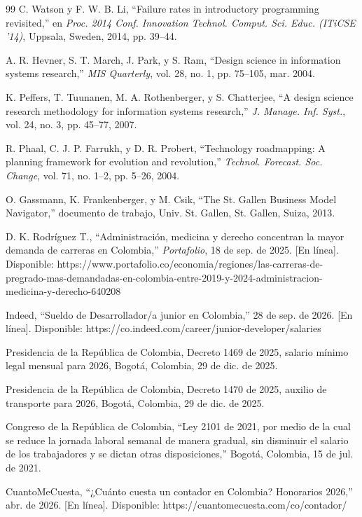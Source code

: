 \documentclass[letterpaper, 10 pt, conference]{ieeeconf}
\begin{document}
\begin{thebibliography}{99}
 C. Watson y F. W. B. Li, “Failure rates in introductory programming revisited,” en \textit{Proc. 2014 Conf. Innovation Technol. Comput. Sci. Educ. (ITiCSE '14)}, Uppsala, Sweden, 2014, pp. 39–44.

 A. R. Hevner, S. T. March, J. Park, y S. Ram, “Design science in information systems research,” \textit{MIS Quarterly}, vol. 28, no. 1, pp. 75–105, mar. 2004.

 K. Peffers, T. Tuunanen, M. A. Rothenberger, y S. Chatterjee, “A design science research methodology for information systems research,” \textit{J. Manage. Inf. Syst.}, vol. 24, no. 3, pp. 45–77, 2007.

 R. Phaal, C. J. P. Farrukh, y D. R. Probert, “Technology roadmapping: A planning framework for evolution and revolution,” \textit{Technol. Forecast. Soc. Change}, vol. 71, no. 1–2, pp. 5–26, 2004.

 O. Gassmann, K. Frankenberger, y M. Csik, “The St. Gallen Business Model Navigator,” documento de trabajo, Univ. St. Gallen, St. Gallen, Suiza, 2013.

 D. K. Rodríguez T., “Administración, medicina y derecho concentran la mayor demanda de carreras en Colombia,” \textit{Portafolio}, 18 de sep. de 2025. [En línea]. Disponible: https://www.portafolio.co/economia/regiones/las-carreras-de-pregrado-mas-demandadas-en-colombia-entre-2019-y-2024-administracion-medicina-y-derecho-640208

 Indeed, “Sueldo de Desarrollador/a junior en Colombia,” 28 de sep. de 2026. [En línea]. Disponible: https://co.indeed.com/career/junior-developer/salaries

 Presidencia de la República de Colombia, Decreto 1469 de 2025, salario mínimo legal mensual para 2026, Bogotá, Colombia, 29 de dic. de 2025.

 Presidencia de la República de Colombia, Decreto 1470 de 2025, auxilio de transporte para 2026, Bogotá, Colombia, 29 de dic. de 2025.

 Congreso de la República de Colombia, “Ley 2101 de 2021, por medio de la cual se reduce la jornada laboral semanal de manera gradual, sin disminuir el salario de los trabajadores y se dictan otras disposiciones,” Bogotá, Colombia, 15 de jul. de 2021.

 CuantoMeCuesta, “¿Cuánto cuesta un contador en Colombia? Honorarios 2026,” abr. de 2026. [En línea]. Disponible: https://cuantomecuesta.com/co/contador/


\end{thebibliography}
\end{document}
